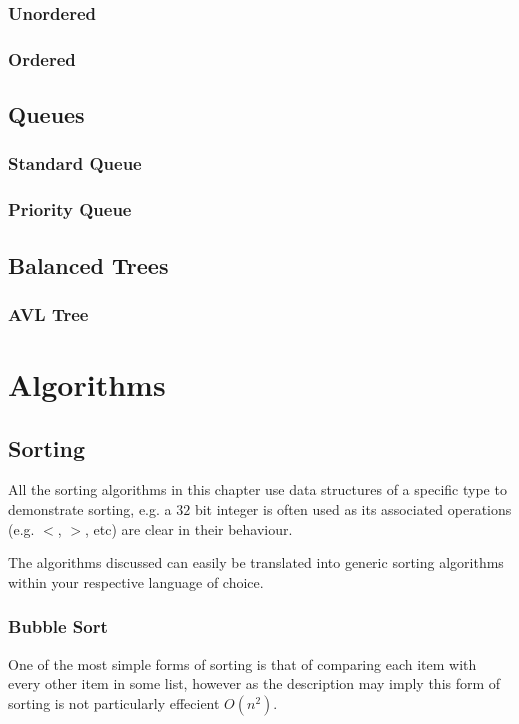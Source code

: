 \documentclass[10pt,oneside,a4paper]{report}
\begin{document}
\section{Unordered}
\section{Ordered}

\chapter{Queues}
\section{Standard Queue}
\section{Priority Queue}

\chapter{Balanced Trees}
\section{AVL Tree}

\part{Algorithms}

\chapter{Sorting}
All the sorting algorithms in this chapter use data structures of a specific type to demonstrate sorting, e.g. a $32$ bit integer is often used as its associated operations (e.g. $<$, $>$, etc) are clear in their behaviour.

The algorithms discussed can easily be translated into generic sorting algorithms within your respective language of choice.

\section{Bubble Sort}
One of the most simple forms of sorting is that of comparing each item with every other item in some list, however as the description may imply this form of sorting is not particularly effecient $O(n^{2})$.
\end{document}
